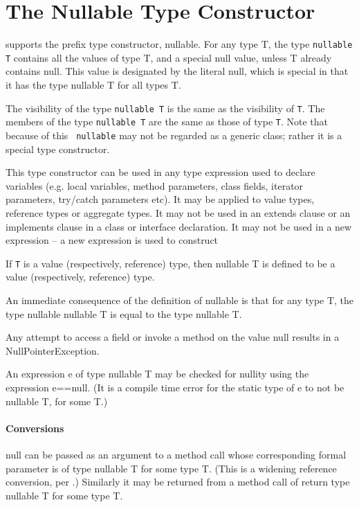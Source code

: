 \section{The Nullable Type Constructor}
\label{NullableTypeConstructor}

\Xten{} supports the prefix type constructor, {\cf nullable}.  For any
type {\cf T}, the type {\tt nullable T} contains all the values of
type {\cf T}, and a special {\cf null} value, unless {\cf T} already
contains {\cf null}. This value is designated by the literal {\cf
null}, which is special in that it has the type {\cf nullable T} for all types
{\cf T}.

The visibility of the type {\tt nullable T} is the same as the
visibility of {\tt T}. The members of the type {\tt nullable T} are
the same as those of type {\tt T}. Note that because of this {\tt
nullable} may not be regarded as a generic class; rather it is a
special type constructor.


This type constructor can be used in any type expression used to
declare variables (e.g.{} local variable{s}, method parameter{s},
class field{s}, iterator parameter{s}, try/catch parameter{s} etc).
It may be applied to value types, reference types or aggregate types.
It may not be used in an {\cf extends} clause or an {\cf implements}
clause in a class or interface declaration. It may not be used 
in a new expression -- a new expression is used to construct 

If {\tt T} is a value
(respectively, reference) type, then {\cf nullable T} is defined to be
a value (respectively, reference) type.

An immediate consequence of the definition of {\cf nullable} is that
for any type {\cf T}, the type {\cf nullable nullable T} is equal to
the type {\cf nullable T}.

Any attempt to access a field or invoke a method on the value {\cf
null} results in a {\cf NullPointerException}.

An expression {\cf e} of type {\cf nullable T} may be checked for nullity
using the expression {\cf e==null}. (It is a compile time error for
the static type of {\cf e} to not be {\cf nullable T}, for some {\cf T}.)

\paragraph{Conversions}
{\cf null} can be passed as an argument to a method call whose
corresponding formal parameter is of type {\cf nullable T} for some type
{\cf T}. (This is a widening reference conversion, per \cite[Sec
5.1.4]{jls2}.) Similarly it may be returned from a method call of
return type {\cf nullable T} for some type {\cf T}.

